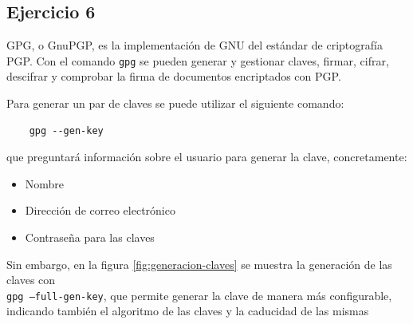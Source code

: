 \subsection{Ejercicio 6}
\graphicspath{ {img/06} }

GPG, o GnuPGP, es la implementación de GNU del estándar de criptografía PGP. Con el comando \texttt{gpg} se pueden generar y gestionar claves, firmar, cifrar, descifrar y comprobar la firma de documentos encriptados con PGP.

Para generar un par de claves se puede utilizar el siguiente comando:
\begin{verbatim}
    gpg --gen-key
\end{verbatim}

que preguntará información sobre el usuario para generar la clave, concretamente:
\begin{itemize}
    \item{Nombre}
    \item{Dirección de correo electrónico}
    \item{Contraseña para las claves}
\end{itemize}

Sin embargo, en la figura \ref{fig:generacion-claves} se muestra la generación de las claves con \\ \texttt{gpg --full-gen-key}, que permite generar la clave de manera más configurable, indicando también el algoritmo de las claves y la caducidad de las mismas

